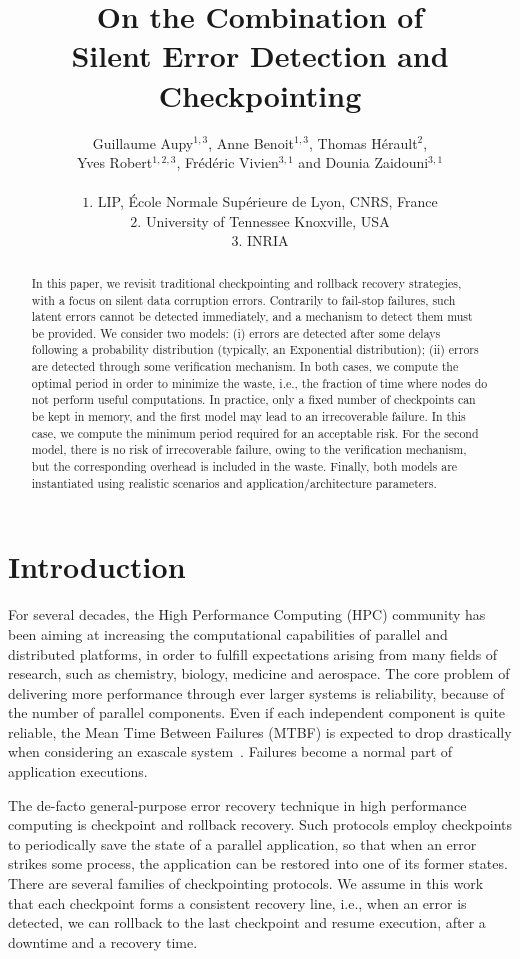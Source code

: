 \documentclass[10pt,table]{article}
\title{On the Combination of \\ [-.3cm]
Silent Error Detection and Checkpointing}
\author{Guillaume Aupy$^{1,3}$, Anne Benoit$^{1,3}$, Thomas H\'erault$^{2}$,\\
 Yves Robert$^{1,2,3}$, Fr\'ed\'eric Vivien$^{3,1}$ and Dounia Zaidouni$^{3,1}$\\~\\
 $1.$ LIP,  \'Ecole Normale Sup\'erieure de Lyon, CNRS, France\\
 $2.$ University of Tennessee Knoxville, USA\\
 $3.$ INRIA
}
\begin{document}
\maketitle

\begin{abstract}
In this paper, we revisit traditional checkpointing and rollback recovery strategies, 
with a focus on silent data corruption errors. Contrarily to fail-stop failures, 
such latent errors cannot be detected immediately, and a mechanism to detect them
must be provided. We consider two models: (i) errors are detected after some delays following a
probability distribution (typically, an Exponential distribution); (ii) errors are detected through some verification mechanism. In both cases, we compute
the optimal period in order to minimize the waste, i.e., the fraction of time
where nodes do not perform useful computations. In practice, only a fixed number of checkpoints 
can be kept in memory, and the first model may lead to an irrecoverable failure.  
In this case, we compute the minimum period
required for an acceptable risk. For the second model, there is no risk of irrecoverable failure, owing to the
verification mechanism, but the corresponding overhead is included in the waste.
Finally, both models are instantiated using realistic scenarios and application/architecture parameters.
\end{abstract}


\section{Introduction}
\label{sec.intro}

For several decades, the High Performance Computing (HPC) community has been aiming
at increasing the computational capabilities of parallel and distributed platforms,
in order to fulfill expectations  arising from many fields of research, such as chemistry, biology,
medicine and aerospace. The core problem of delivering more performance through ever
larger systems is reliability, because of the number of parallel components. Even if each
independent component is quite reliable, the Mean Time Between Failures (MTBF) 
is expected to drop drastically when considering an exascale system~\cite{IESP-Exascale}. 
Failures become a normal part of application executions. 

The de-facto general-purpose error recovery technique in high performance computing is checkpoint 
and rollback recovery.  Such protocols employ checkpoints to periodically save the state of a 
parallel application, so that when an error strikes some process, the application can be
restored into one of its former states. There are several families of checkpointing protocols. 
We assume in this work that each checkpoint forms a consistent recovery line, i.e.,  
when an error is detected, we
can rollback to the last checkpoint and resume execution, after a downtime and a recovery time. 
\end{document}
